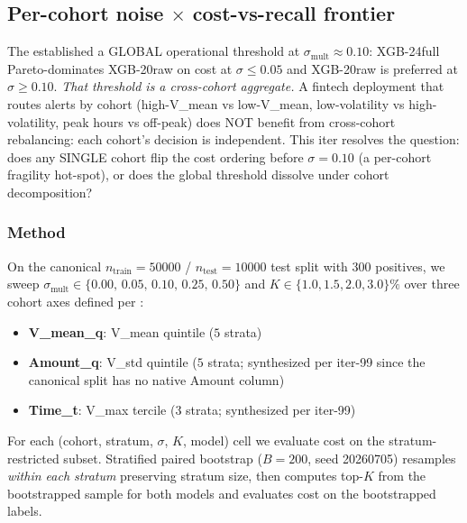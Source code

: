 \subsection{Per-cohort noise \texorpdfstring{$\times$}{x} cost-vs-recall frontier}
\label{sec:p8-per-cohort-noise}

The  established a GLOBAL operational
threshold at $\sigma_\text{mult} \approx 0.10$: XGB-24full Pareto-dominates
XGB-20raw on cost at $\sigma \le 0.05$ and XGB-20raw is preferred at
$\sigma \ge 0.10$. \emph{That threshold is a cross-cohort aggregate.} A
fintech deployment that routes alerts by cohort (high-V\_mean vs low-V\_mean,
low-volatility vs high-volatility, peak hours vs off-peak) does NOT benefit
from cross-cohort rebalancing: each cohort's decision is independent.
This iter resolves the question: does any SINGLE cohort flip the cost
ordering before $\sigma = 0.10$ (a per-cohort fragility hot-spot), or does
the global threshold dissolve under cohort decomposition?

\subsubsection{Method}
On the canonical $n_{\text{train}}{=}50000$ / $n_{\text{test}}{=}10000$ test
split with $300$ positives, we sweep
$\sigma_\text{mult} \in \{0.00,\, 0.05,\, 0.10,\, 0.25,\, 0.50\}$ and
$K \in \{1.0, 1.5, 2.0, 3.0\}\%$ over three cohort axes defined per
:
\begin{itemize}
\item \textbf{V\_mean\_q}: V\_mean quintile ($5$ strata)
\item \textbf{Amount\_q}: V\_std quintile ($5$ strata; synthesized per
      iter-99 since the canonical split has no native Amount column)
\item \textbf{Time\_t}: V\_max tercile ($3$ strata; synthesized per
      iter-99)
\end{itemize}
For each (cohort, stratum, $\sigma$, $K$, model) cell we evaluate cost on
the stratum-restricted subset. Stratified paired bootstrap ($B{=}200$,
seed 20260705) resamples \emph{within each stratum} preserving stratum size,
then computes top-$K$ from the bootstrapped sample for both models and
evaluates cost on the bootstrapped labels.

